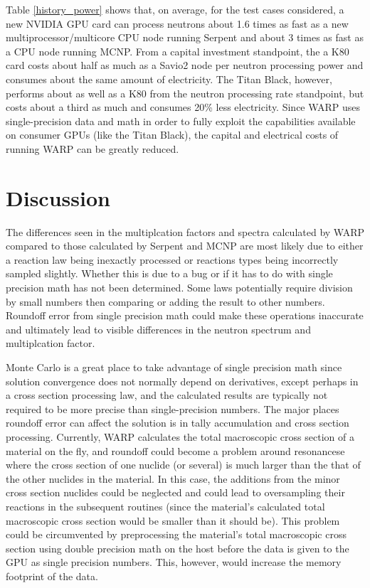 \documentclass[preprint,12pt]{elsarticle}
\begin{document}
Table \ref{history_power} shows that, on average, for the test cases considered, a new NVIDIA GPU card can process neutrons about 1.6 times as fast as a new multiprocessor/multicore CPU node running Serpent and about 3 times as fast as a CPU node running MCNP.  From a capital investment standpoint, the a K80 card costs about half as much as a Savio2 node per neutron processing power and consumes about the same amount of electricity.  The Titan Black, however, performs about as well as a K80 from the neutron processing rate standpoint, but costs about a third as much and consumes 20\% less electricity.  Since WARP uses single-precision data and math in order to fully exploit the capabilities available on consumer GPUs (like the Titan Black), the capital and electrical costs of running WARP can be greatly reduced.  



\section{Discussion}
\label{sec:disc}

The differences seen in the multiplcation factors and spectra calculated by WARP compared to those calculated by Serpent and MCNP are most likely due to either a reaction law being inexactly processed or reactions types being incorrectly sampled slightly.  Whether this is due to a bug or if it has to do with single precision math has not been determined.  Some laws potentially require division by small numbers then comparing or adding the result to other numbers.  Roundoff error from single precision math could make these operations inaccurate and ultimately lead to visible differences in the neutron spectrum and multiplcation factor.  

Monte Carlo is a great place to take advantage of single precision math since solution convergence does not normally depend on derivatives, except perhaps in a cross section processing law, and the calculated results are typically not required to be more precise than single-precision numbers.  The major places roundoff error can affect the solution is in tally accumulation and cross section processing.  Currently, WARP calculates the total macroscopic cross section of a material on the fly, and roundoff could become a problem around resonancese where the cross section of one nuclide (or several) is much larger than the that of the other nuclides in the material.  In this case, the additions from the minor cross section nuclides could be neglected and could lead to oversampling their reactions in the subsequent routines (since the material's calculated total macroscopic cross section would be smaller than it should be).  This problem could be circumvented by preprocessing the material's total macroscopic cross section using double precision math on the host before the data is given to the GPU as single precision numbers.  This, however, would increase the memory footprint of the data.
\end{document}
